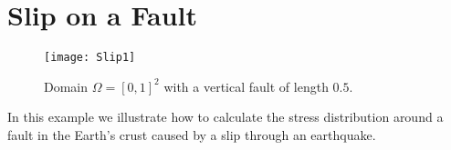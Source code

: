 
%
%
%

\section{Slip on a Fault}\label{Slip CHAP}
\begin{figure}[ht]
\centerline{\texttt{[image: Slip1]}}
\caption{Domain $\Omega=[0,1]^2$ with a vertical fault of length $0.5$.}
\label{fig:slip.1}
\end{figure}
%
In this example we illustrate how to calculate the stress distribution around
a fault in the Earth's crust caused by a slip through
an earthquake.

